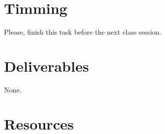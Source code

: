 \section{Timming}

Please, finish this task before the next class session.

\section{Deliverables}

None.

\section{Resources}

\renewcommand{\addcontentsline}[3]{}%

